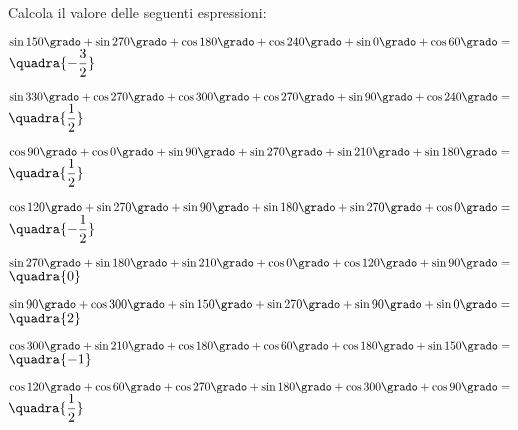\subsubsection*{}

\begin{esercizio}\label{ese:}
 Calcola il valore delle seguenti espressioni:
 \begin{enumeratea}
  \item  $\sin 150 \grado+ \sin 270 \grado+ \cos 180 \grado+ 
          \cos 240 \grado+ \sin 0 \grado+ \cos 60 \grado= $
   \hfill $\quadra{-\dfrac{3}{2}}$
  \item  $\sin 330 \grado+ \cos 270 \grado+ \cos 300 \grado+ 
          \cos 270 \grado+ \sin 90 \grado+ \cos 240 \grado= $
   \hfill $\quadra{\dfrac{1}{2}}$
  \item  $\cos 90 \grado + \cos 0 \grado + \sin 90 \grado + 
          \sin 270 \grado + \sin 210 \grado + \sin 180 \grado = $
   \hfill $\quadra{\dfrac{1}{2}}$
  \item  $\cos 120 \grado + \sin 270 \grado + \sin 90 \grado + 
          \sin 180 \grado + \sin 270 \grado + \cos 0 \grado = $
   \hfill $\quadra{-\dfrac{1}{2}}$
  \item  $\sin 270 \grado + \sin 180 \grado + \sin 210 \grado + 
          \cos 0 \grado + \cos 120 \grado + \sin 90 \grado = $
   \hfill $\quadra{0}$
  \item  $\sin 90 \grado + \cos 300 \grado + \sin 150 \grado + 
          \sin 270 \grado + \sin 90 \grado + \sin 0 \grado = $
   \hfill $\quadra{2}$
  \item  $\cos 300 \grado + \sin 210 \grado + \cos 180 \grado + 
          \cos 60 \grado + \cos 180 \grado + \sin 150 \grado = $
   \hfill $\quadra{-1}$
  \item  $\cos 120 \grado + \cos 60 \grado + \cos 270 \grado + 
          \sin 180 \grado + \cos 300 \grado + \cos 90 \grado = $
   \hfill $\quadra{\dfrac{1}{2}}$

\end{enumeratea}
\end{esercizio}

